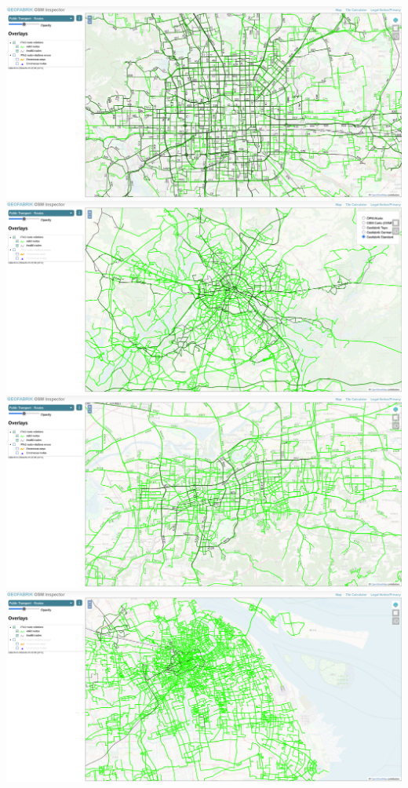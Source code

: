 \documentclass{beamer}
\begin{document}
\begin{frame}
	\begin{columns}
		\includegraphics[width=1\linewidth]{figure/ptv2-beijing.png}
		\vspace{1em}
		\includegraphics[width=1\linewidth]{figure/ptv2-berlin.png}
		\includegraphics[width=1\linewidth]{figure/ptv2-jinan.png}
		\vspace{1em}
		\includegraphics[width=1\linewidth]{figure/ptv2-shanghai.png}
	\end{columns}
\end{frame}
\end{document}
